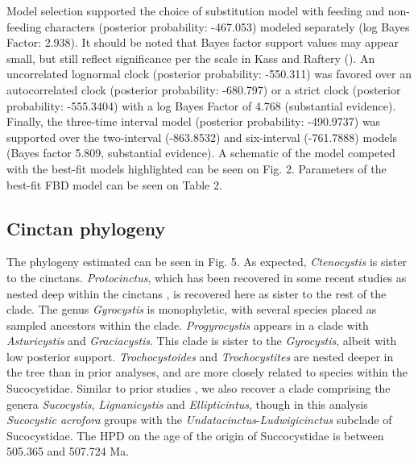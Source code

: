 \documentclass{article}
\begin{document}
Model selection supported the choice of substitution model with feeding and non-feeding characters (posterior probability: -467.053) modeled separately (log Bayes Factor: 2.938).
It should be noted that Bayes factor support values may appear small, but still reflect significance per the scale in Kass and Raftery (\citeyear{Kass1995}).
An uncorrelated lognormal clock (posterior probability: -550.311) was favored over an autocorrelated clock (posterior probability: -680.797) or a strict clock (posterior probability: -555.3404) with a log Bayes Factor of 4.768 (substantial evidence).
Finally, the three-time interval model (posterior probability: -490.9737) was supported over the two-interval (-863.8532) and six-interval (-761.7888) models (Bayes factor 5.809, substantial evidence). 
A schematic of the model competed with the best-fit models highlighted can be seen on Fig. 2.
Parameters of the best-fit FBD model can be seen on Table 2.

\subsection{Cinctan phylogeny}

The phylogeny estimated can be seen in Fig. 5.
As expected, \textit{Ctenocystis} is sister to the cinctans. 
\textit{Protocinctus}, which has been recovered in some recent studies as nested deep within the cinctans \citep{SmithZamora2009}, is recovered here as sister to the rest of the clade. 
The genus \textit{Gyrocystis} is monophyletic, with several species placed as sampled ancestors within the clade. 
 \textit{Progyrocystis} appears in a clade with \textit{Asturicystis} and \textit{Graciacystis}. 
This clade is sister to the \textit{Gyrocystis}, albeit with low posterior support. 
\textit{Trochocystoides} and \textit{Trochocystites} are nested deeper in the tree than in prior analyses, and are more closely related to species within the Sucocystidae.
Similar to prior studies \citep{SmithZamora2009,ZamoraRahmanSmith2013}, we also recover a clade comprising the genera \textit{Sucocystis}, \textit{Lignanicystis} and \textit{Ellipticintus}, though in this analysis \textit{Sucocystic acrofora} groups with the \textit{Undatacinctus}-\textit{Ludwigicinctus} subclade of Sucocystidae.
The HPD on the age of the origin of Succocystidae is between 505.365 and 507.724 Ma.
\end{document}

